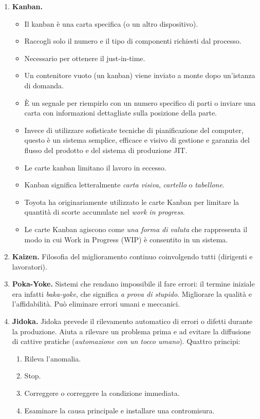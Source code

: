 \documentclass[a4paper,portrait,12pt]{article}
\theoremstyle{definition}
\begin{document}
\begin{enumerate}
\item \textbf{Kanban.}

	\begin{itemize}	
	\item Il kanban è una carta specifica (o un altro dispositivo).
	\item Raccogli solo il numero e il tipo di componenti richiesti dal processo.
	\item Necessario per ottenere il just-in-time.
	\item Un contenitore vuoto (un kanban) viene inviato a monte dopo un'istanza di domanda.
	\item È un segnale per riempirlo con un numero specifico di parti o inviare una carta con informazioni dettagliate sulla posizione della parte.
	\item Invece di utilizzare sofisticate tecniche di pianificazione del computer, questo è un sistema semplice, efficace e visivo di gestione e garanzia del flusso del prodotto e del sistema di produzione JIT.
	\item Le carte kanban limitano il lavoro in eccesso.
	\item Kanban significa letteralmente \emph{carta visiva}, \emph{cartello} o \emph{tabellone}.
	\item Toyota ha originariamente utilizzato le carte Kanban per limitare la quantità di scorte accumulate nel \emph{work in progress}. 
	\item Le carte Kanban agiscono come \emph{una forma di valuta} che rappresenta il modo in cui Work in Progress (WIP) è consentito in un sistema.
	\end{itemize}
	
\item \textbf{Kaizen.} Filosofia del miglioramento continuo
coinvolgendo tutti (dirigenti e lavoratori).

\item \textbf{Poka-Yoke.} Sistemi che rendano impossibile il fare errori: il termine iniziale era infatti \emph{baka-yoke}, che significa \emph{a prova di stupido}.
Migliorare la qualità e l'affidabilità.
Può eliminare errori umani e meccanici.

\item \textbf{Jidoka.} Jidoka prevede il rilevamento automatico di errori o difetti durante la produzione.
Aiuta a rilevare un problema prima e ad evitare la diffusione di cattive pratiche (\emph{automazione con un tocco umano}).
Quattro principi:
\begin{enumerate}
\item Rileva l'anomalia.
\item Stop.
\item Correggere o correggere la condizione immediata.
\item Esaminare la causa principale e installare una contromisura.
\end{enumerate}

\end{enumerate}
\end{document}
